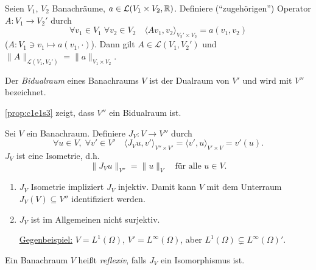 \documentclass[../skript.tex]{subfiles}
\begin{document}
\begin{proposition} %
\label{prop:c1e2s5}
Seien $V_1$, $V_2$ Banachräume, $a \in \mathcal{L}(V_1 \times V_2, \mathbb{R})$. Definiere (``zugehörigen'') Operator $A : V_1 \to V_2'$ durch
\[
	\forall v_1 \in V_1 \; \forall v_2 \in V_2 \quad \langle A v_1, v_2 \rangle_{V_2' \times V_2} = a(v_1, v_2)
\]
($A : V_1 \ni v_1 \mapsto a(v_1, \cdot)$).
Dann gilt $A \in \mathcal{L}(V_1, V_2')$ und $\| A \|_{\mathcal{L}(V_1, V_2')} = \| a \|_{V_1 \times V_2}$.
\end{proposition}
\begin{definition}[Bidualraum] %
\label{def:c1e2s6}
Der \emph{Bidualraum} eines Banachraums $V$ ist der Dualraum von $V'$ und wird mit $V''$ bezeichnet.
\end{definition}
\begin{remark} %
\label{bem:c1e2s7}
\cref{prop:c1e1s3} zeigt, dass $V''$ ein Bidualraum ist.
\end{remark}
\begin{proposition} %
\label{prop:c1e2s8}
Sei $V$ ein Banachraum. Definiere $J_V : V \to V''$ durch
\[
	\forall u \in V, \; \forall v' \in V' \quad \langle J_V u, v' \rangle_{V'' \times V'} = \langle v', u \rangle_{V' \times V} = v'(u).
\]
$J_V$ ist eine Isometrie, d.h.
\[
	\| J_V u \|_{V''} = \| u \|_{V} \quad \text{für alle } u \in V.
\]
\end{proposition}
\begin{remark} %
\label{bem:c1e2s9}
\begin{enumerate}
\item $J_V$ Isometrie impliziert $J_V$ injektiv. Damit kann $V$ mit dem Unterraum $J_V(V) \subseteq V''$ identifiziert werden.
\item $J_V$ ist im Allgemeinen nicht surjektiv. \par 
\underline{Gegenbeispiel:} $V = L^1(\Omega)$, $V' = L^\infty(\Omega)$, aber $L^1(\Omega) \subsetneq L^\infty(\Omega)'$.
\end{enumerate}
\end{remark}
\begin{definition} %
\label{def:c1e2s10}
Ein Banachraum $V$ heißt \emph{reflexiv}, falls $J_V$ ein Isomorphismus ist.
\end{definition}
\end{document}
